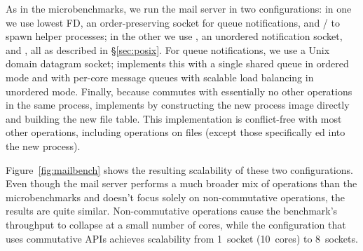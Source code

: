 As in the microbenchmarks, we run the mail server in two configurations:
in one we use lowest FD, an order-preserving socket for queue
notifications, and / to spawn helper processes; in
the other we use , an unordered notification socket, and
, all as described in \S\ref{sec:posix}.
For queue notifications, we use a Unix domain datagram socket;
\sys implements this with a single shared queue in ordered mode and with
per-core message queues with scalable load balancing in unordered
mode.  Finally, because  commutes with essentially no other
operations in the same process,
\sys implements  by constructing the new process image
directly and building the new file
table. This implementation is conflict-free with most other operations,
including operations on
 files (except those specifically ed into the
new process).

Figure~\ref{fig:mailbench} shows the resulting scalability of these two
configurations.  Even though the mail server performs a much broader mix
of operations than the microbenchmarks and doesn't focus solely on
non-commutative operations, the results are quite similar.
Non-commutative operations cause the benchmark's throughput to collapse
at a small number of cores, while the configuration that uses
commutative APIs achieves 
scalability from 1~socket
(10~cores) to 8~sockets.
%
%



%   

\begin{comment}
\begin{figure}
  \centering
  
  \caption{Scalability of $n$ cores forking and exiting a process on xv6
    and Linux.}
  \label{fig:forktest}
\end{figure}
\end{comment}
